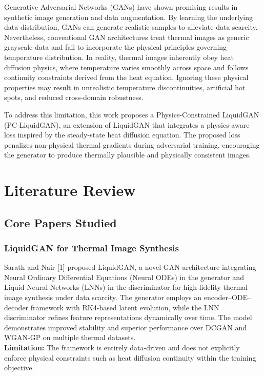 \documentclass[12pt,a4paper]{report}
\begin{document}
Generative Adversarial Networks (GANs) have shown promising results in synthetic image generation and data augmentation. By learning the underlying data distribution, GANs can generate realistic samples to alleviate data scarcity. Nevertheless, conventional GAN architectures treat thermal images as generic grayscale data and fail to incorporate the physical principles governing temperature distribution. In reality, thermal images inherently obey heat diffusion physics, where temperature varies smoothly across space and follows continuity constraints derived from the heat equation. Ignoring these physical properties may result in unrealistic temperature discontinuities, artificial hot spots, and reduced cross-domain robustness.

To address this limitation, this work proposes a Physics-Constrained LiquidGAN (PC-LiquidGAN), an extension of LiquidGAN that integrates a physics-aware loss inspired by the steady-state heat diffusion equation. The proposed loss penalizes non-physical thermal gradients during adversarial training, encouraging the generator to produce thermally plausible and physically consistent images.

\chapter{Literature Review}
\section{Core Papers Studied}
\subsection{LiquidGAN for Thermal Image Synthesis}
Sarath and Nair [1] proposed LiquidGAN, a novel GAN architecture integrating Neural Ordinary Differential Equations (Neural ODEs) in the generator and Liquid Neural Networks (LNNs) in the discriminator for high-fidelity thermal image synthesis under data scarcity. The generator employs an encoder–ODE–decoder framework with RK4-based latent evolution, while the LNN discriminator refines feature representations dynamically over time. The model demonstrates improved stability and superior performance over DCGAN and WGAN-GP on multiple thermal datasets. \\
\textbf{Limitation:} The framework is entirely data-driven and does not explicitly enforce physical constraints such as heat diffusion continuity within the training objective.
\end{document}
